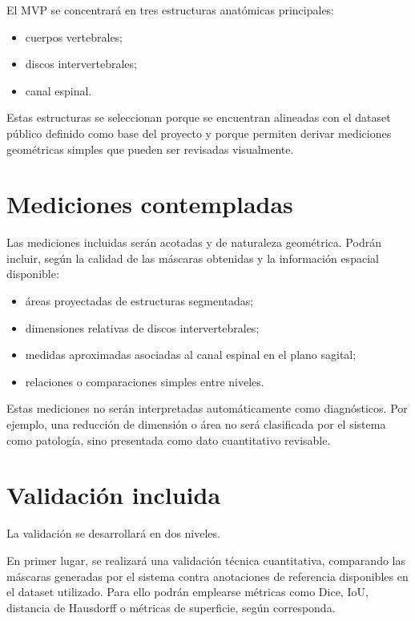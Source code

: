 El MVP se concentrar\'a en tres estructuras anat\'omicas principales:

\begin{itemize}
    \item cuerpos vertebrales;
    \item discos intervertebrales;
    \item canal espinal.
\end{itemize}

Estas estructuras se seleccionan porque se encuentran alineadas con el dataset p\'ublico definido como base del proyecto y porque permiten derivar mediciones geom\'etricas simples que pueden ser revisadas visualmente.

\section{Mediciones contempladas}

Las mediciones incluidas ser\'an acotadas y de naturaleza geom\'etrica. Podr\'an incluir, seg\'un la calidad de las m\'ascaras obtenidas y la informaci\'on espacial disponible:

\begin{itemize}
    \item \'areas proyectadas de estructuras segmentadas;
    \item dimensiones relativas de discos intervertebrales;
    \item medidas aproximadas asociadas al canal espinal en el plano sagital;
    \item relaciones o comparaciones simples entre niveles.
\end{itemize}

Estas mediciones no ser\'an interpretadas autom\'aticamente como diagn\'osticos. Por ejemplo, una reducci\'on de dimensi\'on o \'area no ser\'a clasificada por el sistema como patolog\'ia, sino presentada como dato cuantitativo revisable.

\section{Validaci\'on incluida}

La validaci\'on se desarrollar\'a en dos niveles.

En primer lugar, se realizar\'a una validaci\'on t\'ecnica cuantitativa, comparando las m\'ascaras generadas por el sistema contra anotaciones de referencia disponibles en el dataset utilizado. Para ello podr\'an emplearse m\'etricas como Dice, IoU, distancia de Hausdorff o m\'etricas de superficie, seg\'un corresponda.

